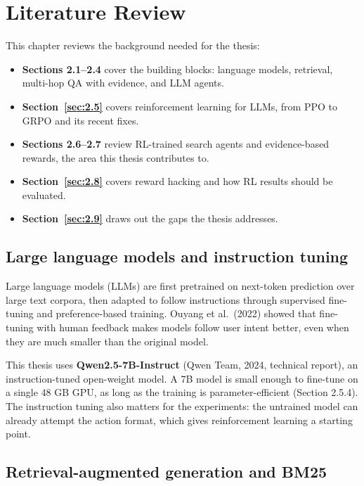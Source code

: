 \chapter{Literature Review}\label{sec:2}

This chapter reviews the background needed for the thesis:

\begin{itemize}
\tightlist
\item
  \textbf{Sections 2.1--2.4} cover the building blocks: language models,
  retrieval, multi-hop QA with evidence, and LLM agents.
\item
  \textbf{Section~\ref{sec:2.5}} covers reinforcement learning for LLMs,
  from PPO to GRPO and its recent fixes.
\item
  \textbf{Sections 2.6--2.7} review RL-trained search agents and
  evidence-based rewards, the area this thesis contributes to.
\item
  \textbf{Section~\ref{sec:2.8}} covers reward hacking and how RL
  results should be evaluated.
\item
  \textbf{Section~\ref{sec:2.9}} draws out the gaps the thesis
  addresses.
\end{itemize}

\section{Large language models and instruction tuning}\label{sec:2.1}

Large language models (LLMs) are first pretrained on next-token
prediction over large text corpora, then adapted to follow instructions
through supervised fine-tuning and preference-based training. Ouyang et
al.~(2022) showed that fine-tuning with human feedback makes models
follow user intent better, even when they are much smaller than the
original model.

This thesis uses \textbf{Qwen2.5-7B-Instruct} (Qwen Team, 2024,
technical report), an instruction-tuned open-weight model. A 7B model is
small enough to fine-tune on a single 48 GB GPU, as long as the training
is parameter-efficient (Section 2.5.4). The instruction tuning also
matters for the experiments: the untrained model can already attempt the
action format, which gives reinforcement learning a starting point.

\section{Retrieval-augmented generation and BM25}\label{sec:2.2}

